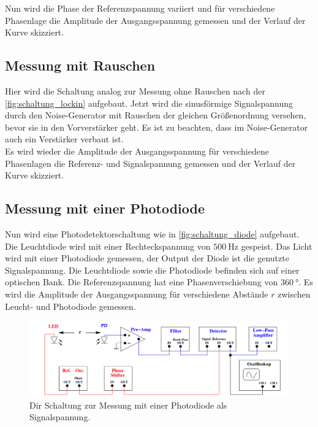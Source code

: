     \noindent Nun wird die Phase der Referenzspannung variiert und für verschiedene Phasenlage die Amplitude der Ausgangsspannung gemessen und 
    der Verlauf der Kurve skizziert. 

\subsection{Messung mit Rauschen}

    Hier wird die Schaltung analog zur Messung ohne Rauschen nach der \autoref{fig:schaltung_lockin} aufgebaut. Jetzt wird die sinusförmige 
    Signalspannung durch den Noise-Generator mit Rauschen der gleichen Größenordnung versehen, bevor sie in den Vorverstärker geht. Es ist 
    zu beachten, dass im Noise-Generator auch ein Verstärker verbaut ist. \\
    Es wird wieder die Amplitude der Ausgangsspannung für verschiedene Phasenlagen die Referenz- und Signalspannung gemessen und der Verlauf 
    der Kurve skizziert. 

\subsection{Messung mit einer Photodiode}

    Nun wird eine Photodetektorschaltung wie in \autoref{fig:schaltung_diode} aufgebaut. Die Leuchtdiode wird mit einer Rechteckspannung 
    von $\SI{500}{\hertz}$ gespeist. Das Licht wird mit einer Photodiode gemessen, der Output der Diode ist die genutzte Signalspannung.
    Die Leuchtdiode sowie die Photodiode befinden sich auf einer optischen Bank.  
    Die Referenzspannung hat eine Phasenverschiebung von $\SI{360}{\degree}$. Es wird die Amplitude der Ausgangsspannung für verschiedene
    Abstände $r$ zwischen Leucht- und Photodiode gemessen.

    \begin{figure}[H]
        \centering
        \includegraphics[width=\textwidth]{bilder/schaltkreis_diode.png}
        \caption{Dir Schaltung zur Messung mit einer Photodiode als Signalspannung. \cite{anleitung}}
        \label{fig:schaltung_diode}
    \end{figure}


